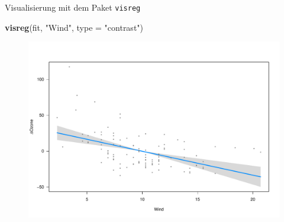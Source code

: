 \documentclass[ignorenonframetext,]{beamer}
\newenvironment{Shaded}{}{}
\newcommand{\KeywordTok}[1]{\textcolor[rgb]{0.00,0.44,0.13}{\textbf{{#1}}}}
\newcommand{\DataTypeTok}[1]{\textcolor[rgb]{0.56,0.13,0.00}{{#1}}}
\newcommand{\StringTok}[1]{\textcolor[rgb]{0.25,0.44,0.63}{{#1}}}
\newcommand{\NormalTok}[1]{{#1}}
\begin{document}
\begin{frame}[fragile]{Visualisierung mit dem Paket \texttt{visreg}}

\begin{Shaded}
\begin{Highlighting}[]
\KeywordTok{visreg}\NormalTok{(fit, }\StringTok{"Wind"}\NormalTok{, }\DataTypeTok{type =} \StringTok{"contrast"}\NormalTok{)}
\end{Highlighting}
\end{Shaded}

\begin{figure}[htbp]
\centering
\includegraphics{RSocialScience2_files/figure-beamer/unnamed-chunk-81-1.pdf}
\caption{}
\end{figure}

\end{frame}
\end{document}

